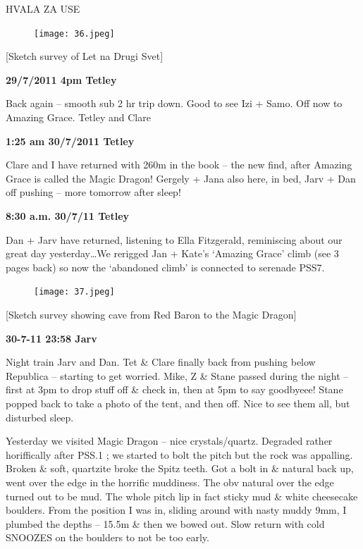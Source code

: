 HVALA ZA USE

\begin{figure}[htbp]
\centering
\texttt{[image: 36.jpeg]}
\caption{}
\end{figure}

{[}Sketch survey of Let na Drugi Svet{]}

\textbf{29/7/2011 4pm Tetley}

Back again -- smooth sub 2 hr trip down. Good to see Izi + Samo. Off now
to Amazing Grace. Tetley and Clare

\textbf{1:25 am 30/7/2011 Tetley}

Clare and I have returned with 260m in the book -- the new find, after
Amazing Grace is called the Magic Dragon! Gergely + Jana also here, in
bed, Jarv + Dan off pushing -- more tomorrow after sleep!

\textbf{8:30 a.m. 30/7/11 Tetley}

Dan + Jarv have returned, listening to Ella Fitzgerald, reminiscing
about our great day yesterday\ldots{}We rerigged Jan + Kate's `Amazing
Grace' climb (see 3 pages back) so now the `abandoned climb' is
connected to serenade PSS7.

\begin{figure}[htbp]
\centering
\texttt{[image: 37.jpeg]}
\caption{}
\end{figure}

{[}Sketch survey showing cave from Red Baron to the Magic Dragon{]}

\textbf{30-7-11 23:58 Jarv}

Night train Jarv and Dan. Tet \& Clare finally back from pushing below
Republica -- starting to get worried. Mike, Z \& Stane passed during the
night -- first at 3pm to drop stuff off \& check in, then at 5pm to say
goodbyeee! Stane popped back to take a photo of the tent, and then off.
Nice to see them all, but disturbed sleep.

Yesterday we visited Magic Dragon -- nice crystals/quartz. Degraded
rather horiffically after PSS.1 ; we started to bolt the pitch but the
rock was appalling. Broken \& soft, quartzite broke the Spitz teeth. Got
a bolt in \& natural back up, went over the edge in the horrific
muddiness. The obv natural over the edge turned out to be mud. The whole
pitch lip in fact sticky mud \& white cheesecake boulders. From the
position I was in, sliding around with nasty muddy 9mm, I plumbed the
depths -- 15.5m \& then we bowed out. Slow return with cold SNOOZES on
the boulders to not be too early.

